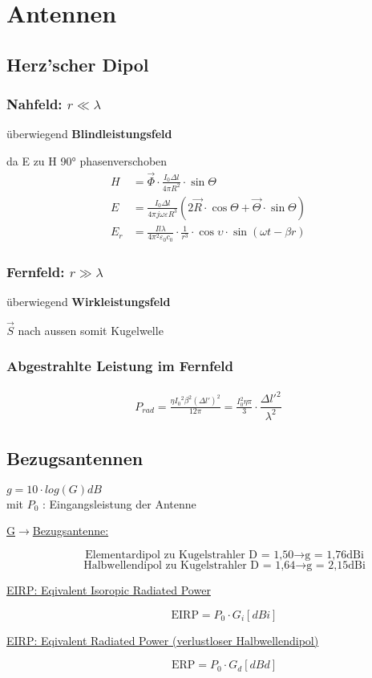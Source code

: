 \section{Antennen}
\subsection{Herz'scher Dipol}
\subsubsection{Nahfeld: $r \ll \lambda$}

überwiegend \textbf{Blindleistungsfeld}

da E zu H 90° phasenverschoben
\begin{align*}
    H &= \vec{\Phi}\cdot\frac{I_0 \Delta l}{4\pi R^2}\cdot \sin\Theta\\
    E &= \frac{I_0 \Delta l}{4\pi j \omega\varepsilon R^3}(2\vec{R} \cdot \cos\Theta + \vec{\Theta}\cdot \sin\Theta)\\
    E_r &= \frac{I l \lambda}{4\pi^2\varepsilon_0  c_0}\cdot \frac{1}{r^3} \cdot\cos\upsilon \cdot \sin(\omega t - \beta r)
\end{align*}

\subsubsection{Fernfeld: $r \gg \lambda$}

überwiegend \textbf{Wirkleistungsfeld}

$\vec{S}$ nach aussen somit Kugelwelle

\subsubsection{Abgestrahlte Leistung im Fernfeld}
\begin{align*}
    P_{rad} = \frac{\eta {I_0}^2 \beta^2 (\Delta l')^2}{12\pi} = \frac{I_0^2\eta\pi}{3}\cdot \dfrac{\Delta l'^2}{\lambda^2}
\end{align*}
\subsection{Bezugsantennen}
$ \boxed{g = 10 \cdot log(G)dB}$ \\
mit $P_0$ : Eingangsleistung der Antenne
\begin{description}
    \item [\underline{G$\rightarrow$Bezugsantenne:}]
          \[
              \text{Elementardipol  zu Kugelstrahler D = 1,50} \rightarrow \text{g = 1,76dBi}
          \]
          \[
              \text{Halbwellendipol zu Kugelstrahler D = 1,64} \rightarrow \text{g = 2,15dBi}
          \]
    \item[\underline{EIRP: Eqivalent \underline{Isoropic} Radiated Power}]
          \[
              \text{EIRP} = P_0 \cdot G_i [dBi]
          \]
    \item[\underline{EIRP: Eqivalent Radiated Power (verlustloser Halbwellendipol)}]
          \[
              \text{ERP} = P_0 \cdot G_d [dBd]
          \]
\end{description}